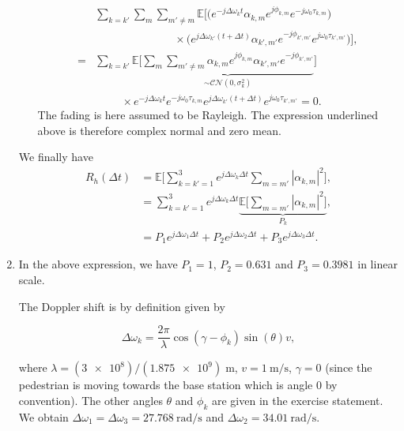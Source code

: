 \documentclass [a4paper, 11pt] {article}
\begin{document}
\begin{solution}
\begin{enumerate}
\begin{itemize}
            \begin{align}
             &\sum_{k = k'} \sum_{m} \sum_{m'\neq m} \mathbb{E}\Bigg[\Big(  e^{-j\Delta \omega_{k} t} \alpha_{k,m} e^{j\phi_{k,m}} e^{-j\omega_0 \tau_{k,m}} \Big)\\
             &\hspace{3cm} \times\Big(  e^{j\Delta \omega_{k'} (t+\Delta t)} \alpha_{k',m'} e^{-j\phi_{k',m'}} e^{j\omega_0 \tau_{k',m'}} \Big) \Bigg] \nonumber,\\
             =&\sum_{k = k'} \mathbb{E}\Bigg[ \underbrace{\sum_{m} \sum_{m'\neq m} \alpha_{k,m} e^{j\phi_{k,m}}  \alpha_{k',m'} e^{-j\phi_{k',m'}}}_{\sim \mathcal{CN}(0,\sigma_k^2)}  \Bigg] \\
             &\hspace{1cm}\times e^{-j\Delta \omega_{k} t}  e^{-j\omega_0 \tau_{k,m}} e^{j\Delta \omega_{k'} (t+\Delta t)} e^{j\omega_0 \tau_{k',m'}} = 0\nonumber.
            \end{align}
        The fading is here assumed to be Rayleigh. The expression underlined above is therefore complex normal and zero mean. 
        
        \end{itemize}
        
        We finally have 
        \begin{align}
        R_h(\Delta t) &= \mathbb{E}\Bigg[ \sum_{k = k'=1}^{3} e^{j\Delta \omega_{k} \Delta t} \sum_{m = m'} | \alpha_{k,m}|^2 \Bigg], \\
        &=  \sum_{k = k'=1}^{3} e^{j\Delta \omega_{k} \Delta t} \underbrace{\mathbb{E}\Bigg[\sum_{m = m'} | \alpha_{k,m}|^2 \Bigg]}_{P_k},\\
        &= P_1 e^{j\Delta \omega_{1} \Delta t} + P_2 e^{j\Delta \omega_{2} \Delta t} +P_3 e^{j\Delta \omega_{3} \Delta t}.
        \end{align}
        
        \item In the above expression, we have $P_1 = 1$, $P_2 = 0.631$ and $P_3 = 0.3981$ in linear scale. 
        
        The Doppler shift is by definition given by 
        
    \begin{equation}\Delta \omega_k = \dfrac{2\pi}{\lambda}\cos(\gamma - \phi_{k})\sin(\theta)v,
    \end{equation}
        
        where $\lambda = (\num{3e8})/(\num{1.875e9})\;\si{\meter}$, $v = \SI{1}{\meter\per\second}$, $\gamma = 0$ (since the pedestrian is moving towards the base station which is angle 0 by convention). The other angles $\theta$ and $\phi_k$ are given in the exercise statement. We obtain $\Delta \omega_1 = \Delta \omega_3 = \SI{27.768}{\radian\per\second}$ and  $\Delta \omega_2 = \SI{34.01}{\radian\per\second}$. 
        

\end{enumerate}
\end{solution}
\end{document}
